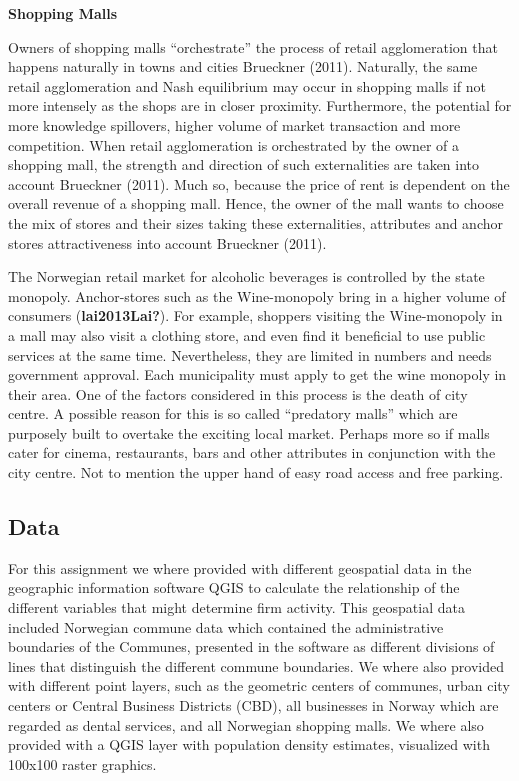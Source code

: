 \documentclass[
  10,
  a4paper,
]{article}
\begin{document}
\textbf{Shopping Malls}

Owners of shopping malls ``orchestrate'' the process of retail
agglomeration that happens naturally in towns and cities Brueckner
(2011). Naturally, the same retail agglomeration and Nash equilibrium
may occur in shopping malls if not more intensely as the shops are in
closer proximity. Furthermore, the potential for more knowledge
spillovers, higher volume of market transaction and more competition.
When retail agglomeration is orchestrated by the owner of a shopping
mall, the strength and direction of such externalities are taken into
account Brueckner (2011). Much so, because the price of rent is
dependent on the overall revenue of a shopping mall. Hence, the owner of
the mall wants to choose the mix of stores and their sizes taking these
externalities, attributes and anchor stores attractiveness into account
Brueckner (2011).

The Norwegian retail market for alcoholic beverages is controlled by the
state monopoly. Anchor-stores such as the Wine-monopoly bring in a
higher volume of consumers (\textbf{lai2013Lai?}). For example, shoppers
visiting the Wine-monopoly in a mall may also visit a clothing store,
and even find it beneficial to use public services at the same time.
Nevertheless, they are limited in numbers and needs government approval.
Each municipality must apply to get the wine monopoly in their area. One
of the factors considered in this process is the death of city centre. A
possible reason for this is so called ``predatory malls'' which are
purposely built to overtake the exciting local market. Perhaps more so
if malls cater for cinema, restaurants, bars and other attributes in
conjunction with the city centre. Not to mention the upper hand of easy
road access and free parking.

\hypertarget{data}{%
\subsection{Data}\label{data}}

For this assignment we where provided with different geospatial data in
the geographic information software QGIS to calculate the relationship
of the different variables that might determine firm activity. This
geospatial data included Norwegian commune data which contained the
administrative boundaries of the Communes, presented in the software as
different divisions of lines that distinguish the different commune
boundaries. We where also provided with different point layers, such as
the geometric centers of communes, urban city centers or Central
Business Districts (CBD), all businesses in Norway which are regarded as
dental services, and all Norwegian shopping malls. We where also
provided with a QGIS layer with population density estimates, visualized
with 100x100 raster graphics.
\end{document}
